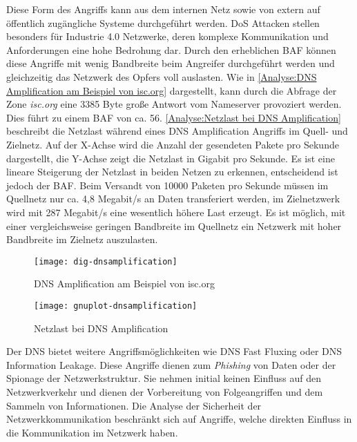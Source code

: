 Diese Form des Angriffs kann aus dem internen Netz sowie von extern auf öffentlich zugängliche Systeme durchgeführt werden. \ac{DoS} Attacken stellen besonders für Industrie 4.0 Netzwerke, deren komplexe Kommunikation und Anforderungen eine hohe Bedrohung dar. Durch den erheblichen \ac{BAF} können diese Angriffe mit wenig Bandbreite beim Angreifer durchgeführt werden und gleichzeitig das Netzwerk des Opfers voll auslasten. Wie in \autoref{Analyse:DNS Amplification am Beispiel von isc.org} dargestellt, kann durch die Abfrage der Zone \textit{isc.org} eine 3385 Byte große Antwort vom Nameserver provoziert werden. Dies führt zu einem \ac{BAF} von ca. 56. \autoref{Analyse:Netzlast bei DNS Amplification} beschreibt die Netzlast während eines \ac{DNS} Amplification Angriffs im Quell- und Zielnetz. Auf der X-Achse wird die Anzahl der gesendeten Pakete pro Sekunde dargestellt, die Y-Achse zeigt die Netzlast in Gigabit pro Sekunde. Es ist eine lineare Steigerung der Netzlast in beiden Netzen zu erkennen, entscheidend ist jedoch der \ac{BAF}. Beim Versandt von 10000 Paketen pro Sekunde müssen im Quellnetz nur ca. 4,8 Megabit/s an Daten transferiert werden, im Zielnetzwerk wird mit 287 Megabit/s eine wesentlich höhere Last erzeugt. Es ist möglich, mit einer vergleichsweise geringen Bandbreite im Quellnetz ein Netzwerk mit hoher Bandbreite im Zielnetz auszulasten.

\begin{figure}[h]
    \centering
    \texttt{[image: dig-dnsamplification]}
    \caption{DNS Amplification am Beispiel von isc.org}
    \label{Analyse:DNS Amplification am Beispiel von isc.org}
\end{figure}

\begin{figure}[h]
    \centering
    \texttt{[image: gnuplot-dnsamplification]}
    \caption{Netzlast bei DNS Amplification}
    \label{Analyse:Netzlast bei DNS Amplification}
\end{figure}

Der \ac{DNS} bietet weitere Angriffsmöglichkeiten wie \ac{DNS} Fast Fluxing oder \ac{DNS} Information Leakage. Diese Angriffe dienen zum \textit{Phishing} von Daten oder der Spionage der Netzwerkstruktur. Sie nehmen initial keinen Einfluss auf den Netzwerkverkehr und dienen der Vorbereitung von Folgeangriffen und dem Sammeln von Informationen. Die Analyse der Sicherheit der Netzwerkkommunikation beschränkt sich auf Angriffe, welche direkten Einfluss in die Kommunikation im Netzwerk haben.

